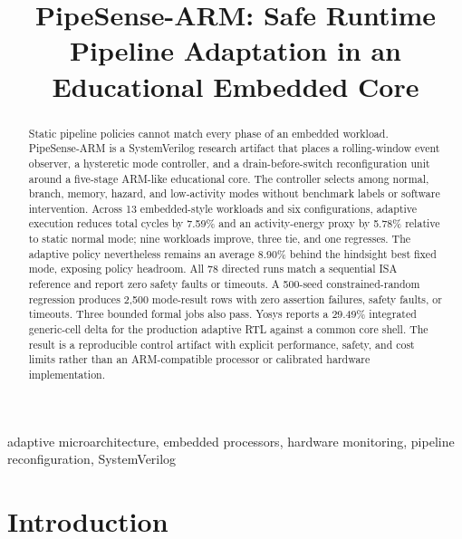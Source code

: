 \documentclass[conference]{IEEEtran}
\newcommand{\pipesense}{PipeSense-ARM}
\begin{document}
\title{\pipesense: Safe Runtime Pipeline Adaptation in an Educational Embedded Core}

\author{
}

\maketitle

\begin{abstract}
Static pipeline policies cannot match every phase of an embedded workload.
\pipesense{} is a SystemVerilog research artifact that places a rolling-window
event observer, a hysteretic mode controller, and a drain-before-switch
reconfiguration unit around a five-stage ARM-like educational core. The
controller selects among normal, branch, memory, hazard, and low-activity
modes without benchmark labels or software intervention. Across 13
embedded-style workloads and six configurations, adaptive execution reduces
total cycles by 7.59\% and an activity-energy proxy by 5.78\% relative to
static normal mode; nine workloads improve, three tie, and one regresses. The
adaptive policy nevertheless remains an average 8.90\% behind the hindsight
best fixed mode, exposing policy headroom. All 78 directed runs match a
sequential ISA reference and report zero safety faults or timeouts. A 500-seed
constrained-random regression produces 2,500 mode-result rows with zero
assertion failures, safety faults, or timeouts. Three bounded formal jobs also
pass. Yosys reports a 29.49\% integrated generic-cell delta for the production
adaptive RTL against a common core shell. The result is a reproducible control
artifact with explicit performance, safety, and cost limits rather than an
ARM-compatible processor or calibrated hardware implementation.
\end{abstract}

\begin{IEEEkeywords}
adaptive microarchitecture, embedded processors, hardware monitoring,
pipeline reconfiguration, SystemVerilog
\end{IEEEkeywords}

\section{Introduction}
\end{document}
